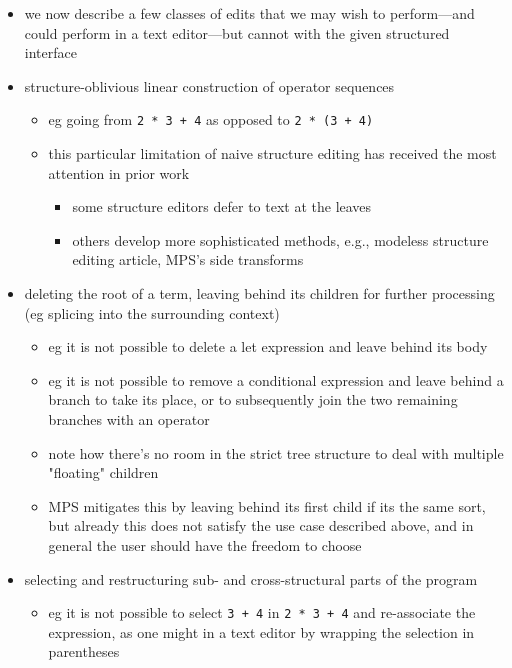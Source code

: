 \begin{itemize}
\item
  we now describe a few classes of edits that we may wish to perform---and
  could perform in a text editor---but cannot with the given structured
  interface
\item structure-oblivious linear construction of operator sequences
  \begin{itemize}
    \item eg going from \texttt{2 * 3 + 4} as opposed to \texttt{2 * (3 + 4)}
    \item this particular limitation of naive structure editing has received
      the most attention in prior work
    \begin{itemize}
      \item some structure editors defer to text at the leaves
      \item others develop more sophisticated methods, e.g.,
        modeless structure editing article,
        MPS's side transforms
    \end{itemize}
  \end{itemize}
\item deleting the root of a term,
  leaving behind its children for further processing
  (eg splicing into the surrounding context)
  \begin{itemize}
    \item eg it is not possible to delete a let expression and leave behind its body
    \item eg it is not possible to remove a conditional expression
      and leave behind a branch to take its place, or to subsequently join the
      two remaining branches with an operator
    \item note how there's no room in the strict tree structure to deal with
      multiple "floating" children
    \item MPS mitigates this by leaving behind its first child if its the
      same sort, but already this does not satisfy the use case described above,
      and in general the user should have the freedom to choose
  \end{itemize}
\item selecting and restructuring sub- and cross-structural
  parts of the program
  \begin{itemize}
    \item eg it is not possible to select \texttt{3 + 4} in \texttt{2 * 3 + 4}
      and re-associate the expression, as one might in a text editor by
      wrapping the selection in parentheses

\end{itemize}
\end{itemize}
